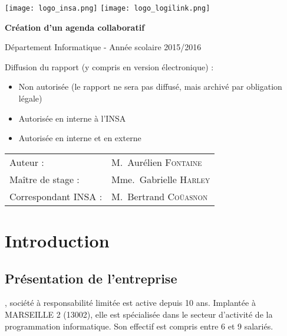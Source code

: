 \documentclass[a4paper, 11pt]{report}
\begin{document}
    \begin{titlepage}
        \texttt{[image: logo\_insa.png]}
        \hspace{0.35\textwidth}
        \texttt{[image: logo\_logilink.png]}
        \begin{center}
            \vspace{7cm}
            {\huge\bfseries Création d'un agenda collaboratif \par}
            \vspace{0.5cm}
            {\Large Département Informatique - Année scolaire 2015/2016\par}
        \end{center}
        \vfill

        Diffusion du rapport (y compris en version électronique) :

        \begin{itemize}[label=$\square$]
            \item Non autorisée (le rapport ne sera pas diffusé, mais archivé par obligation légale)
            \item Autorisée en interne à l’INSA
            \item Autorisée en interne et en externe
        \end{itemize}

        \vspace{0.5cm}

        \begin{tabular}{ll}
            {\Large Auteur :}             & M.~Aurélien \textsc{Fontaine}\\
            {\Large Maître de stage :}    & Mme.~Gabrielle \textsc{Harley}\\
            {\Large Correspondant INSA :} & M.~Bertrand \textsc{Coüasnon}\\
        \end{tabular}
    \end{titlepage}

\tableofcontents

\part{Introduction}
\chapter{Présentation de l'entreprise}
\logilink, société à responsabilité limitée est active depuis 10 ans.
Implantée à MARSEILLE 2 (13002), elle est spécialisée dans le secteur d'activité de la programmation informatique. Son effectif est compris entre 6 et 9 salariés.
\end{document}
